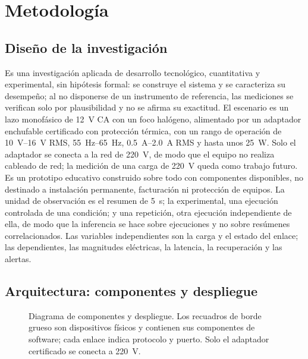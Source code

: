 
\section{Metodología}
\label{sec:methodology}

\subsection{Diseño de la investigación}
\label{sec:design}
Es una investigación aplicada de desarrollo tecnológico, cuantitativa y experimental, sin hipótesis formal: se construye el sistema y se caracteriza su desempeño; al no disponerse de un instrumento de referencia, las mediciones se verifican solo por plausibilidad y no se afirma su exactitud.
El escenario es un lazo monofásico de \SI{12}{V} CA con un foco halógeno, alimentado por un adaptador enchufable certificado con protección térmica, con un rango de operación de \SIrange{10}{16}{V} RMS, \SIrange{55}{65}{Hz}, \SIrange{0,5}{2,0}{A} RMS y hasta unos \SI{25}{W}.
Solo el adaptador se conecta a la red de \SI{220}{V}, de modo que el equipo no realiza cableado de red; la medición de una carga de \SI{220}{V} queda como trabajo futuro.
Es un prototipo educativo construido sobre todo con componentes disponibles, no destinado a instalación permanente, facturación ni protección de equipos.
La unidad de observación es el resumen de \SI{5}{s}; la experimental, una ejecución controlada de una condición; y una repetición, otra ejecución independiente de ella, de modo que la inferencia se hace sobre ejecuciones y no sobre resúmenes correlacionados.
Las variables independientes son la carga y el estado del enlace; las dependientes, las magnitudes eléctricas, la latencia, la recuperación y las alertas.

\subsection{Arquitectura: componentes y despliegue}
\label{sec:architecture}
\begin{figure}[t]
  \centering
  
  \caption{Diagrama de componentes y despliegue. Los recuadros de borde grueso son dispositivos físicos y contienen sus componentes de software; cada enlace indica protocolo y puerto. Solo el adaptador certificado se conecta a \SI{220}{V}.}
  \label{fig:architecture}
\end{figure}

